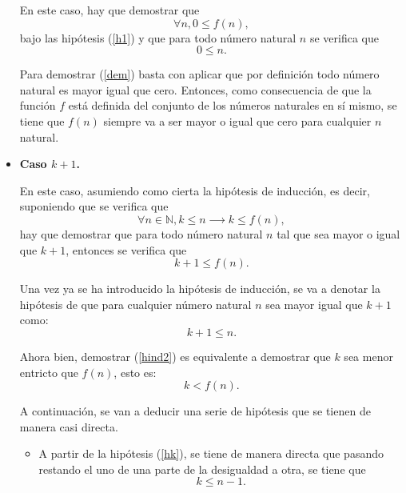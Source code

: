 \begin{demostracion}
\begin{itemize}
      En este caso, hay que demostrar que
      \begin{equation}\label{dem}
        ∀n,0≤f(n),
      \end{equation}
      bajo las hipótesis (\ref{h1}) y que para todo número natural
      \(n\) se verifica que
      \begin{equation}
        0≤ n. 
      \end{equation}

      Para demostrar (\ref{dem}) basta con aplicar que por
      definición todo número natural es mayor igual que cero.
      Entonces, como consecuencia de que la función \(f\) está
      definida del conjunto de los números naturales en sí mismo, se tiene
      que \(f(n)\) siempre va a ser mayor o igual que cero para
      cualquier \(n\) natural.
      
    \item \textbf{Caso \(k+1\).}
    
      En este caso, asumiendo como cierta la hipótesis de inducción,
      es decir, suponiendo que se verifica que
      \begin{equation}\label{hind}\tag{h\(\_\)ind}
        ∀ n ∈ ℕ, k≤ n ⟶ k ≤ f(n),
      \end{equation}
      hay que demostrar que para todo número natural \(n\) tal que
      sea mayor o igual que \(k+1\), entonces se verifica que
      \begin{equation}\label{hind2}
        k+1 ≤ f(n).
      \end{equation}

      Una vez ya se ha introducido la hipótesis de inducción, se va
      a denotar la hipótesis de que para cualquier número natural
      \(n\) sea mayor igual que \(k+1\) como:
      \begin{equation}\label{hk}\tag{hk}
        k+1≤n.
      \end{equation}

      Ahora bien, demostrar (\ref{hind2}) es equivalente a demostrar
      que \(k\) sea menor entricto que \(f(n)\), esto es:
      \begin{equation}\label{hind3}
        k<f(n).
      \end{equation}

      A continuación, se van a deducir una serie de hipótesis que se
      tienen de manera casi directa.
      \begin{itemize}
      \item A partir de la hipótesis (\ref{hk}), se tiene de manera
        directa que pasando restando el uno de una parte de la
        desigualdad a otra, se tiene que
        \begin{equation}\label{hk1}\tag{hk1}
          k≤n-1.
        \end{equation}
        

\end{itemize}
\end{itemize}
\end{demostracion}
